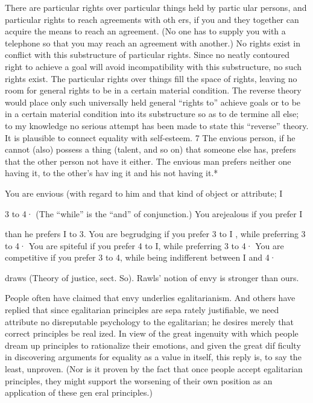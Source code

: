 \documentclass[11pt,openany]{book}
\begin{document}
There are particular rights over particular things held by partic ular persons, and particular rights to reach agreements with oth ers, if you and they together can acquire the means to reach an agreement. (No one has to supply you with a telephone so that you may reach an agreement with another.) No rights exist in conflict with this substructure of particular rights. Since no neatly contoured right to achieve a goal will avoid incompatibility with this substructure, no such rights exist. The particular rights over things fill the space of rights, leaving no room for general rights to be in a certain material condition. The reverse theory would place only such universally held general ``rights to'' achieve goals or to be in a certain material condition into its substructure so as to de termine all else; to my knowledge no serious attempt has been made to state this ``reverse'' theory. It is plausible to connect equality with self-esteem. 7 The envious person, if he cannot (also) possess a thing (talent, and so on) that someone else has, prefers that the other person not have it either. The envious man prefers neither one having it, to the other's hav ing it and his not having it.* 

You are envious (with regard to him and that kind of object or attribute; I 

3 to 4· (The ``while'' is the ``and'' of conjunction.) You arejealous if you prefer I 

than he prefers I to 3. You are begrudging if you prefer 3 to I , while preferring 3 to 4· You are spiteful if you prefer 4 to I, while preferring 3 to 4· You are competitive if you prefer 3 to 4, while being indifferent between I and 4· 

draws (Theory of justice, sect. So). Rawls' notion of envy is stronger than ours. 

People often have claimed that envy underlies egalitarianism. And others have replied that since egalitarian principles are sepa rately justifiable, we need attribute no disreputable psychology to the egalitarian; he desires merely that correct principles be real ized. In view of the great ingenuity with which people dream up principles to rationalize their emotions, and given the great dif ficulty in discovering arguments for equality as a value in itself, this reply is, to say the least, unproven. (Nor is it proven by the fact that once people accept egalitarian principles, they might support the worsening of their own position as an application of these gen eral principles.) 
\end{document}
